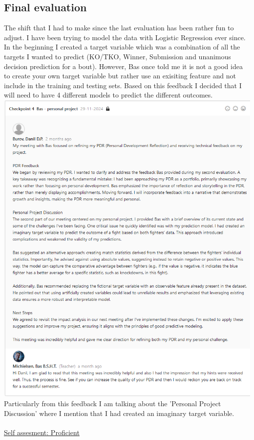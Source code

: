 \documentclass{article}
\begin{document}
	\subsection{Final evaluation}
	The shift that I had to make since the last evaluation has been rather fun to adjust. I have been trying to model the data with Logistic Regression ever since. In the beginning I created a target variable which was a combination of all the targets I wanted to predict (KO/TKO, Winner, Submission and unanimous decision prediction for a bout). However, Bas once told me it is not a good idea to create your own target variable but rather use an exisiting feature and not include in the training and testing sets. Based on this feedback I decided that I will need to have 4 different models to predict the different outcomes.
	\includegraphics[width=\textwidth]{images/Feedback_Bas_1.png}
	\newpage
	Particularly from this feedback I am talking about the 'Personal Project Discussion' where I mention that I had created an imaginary target variable.\\\\
	\underline{Self assesment: Proficient}
\end{document}
